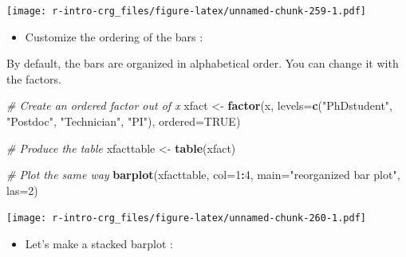 \documentclass[]{book}
\newenvironment{Shaded}{\begin{snugshade}}{\end{snugshade}}
\newcommand{\CommentTok}[1]{\textcolor[rgb]{0.56,0.35,0.01}{\textit{#1}}}
\newcommand{\DataTypeTok}[1]{\textcolor[rgb]{0.13,0.29,0.53}{#1}}
\newcommand{\DecValTok}[1]{\textcolor[rgb]{0.00,0.00,0.81}{#1}}
\newcommand{\KeywordTok}[1]{\textcolor[rgb]{0.13,0.29,0.53}{\textbf{#1}}}
\newcommand{\NormalTok}[1]{#1}
\newcommand{\OperatorTok}[1]{\textcolor[rgb]{0.81,0.36,0.00}{\textbf{#1}}}
\newcommand{\OtherTok}[1]{\textcolor[rgb]{0.56,0.35,0.01}{#1}}
\newcommand{\StringTok}[1]{\textcolor[rgb]{0.31,0.60,0.02}{#1}}
\providecommand{\tightlist}{%
  \setlength{\itemsep}{0pt}\setlength{\parskip}{0pt}}
\begin{document}
\texttt{[image: r-intro-crg\_files/figure-latex/unnamed-chunk-259-1.pdf]}

\begin{itemize}
\tightlist
\item
  Customize the ordering of the bars :
\end{itemize}

By default, the bars are organized in alphabetical order. You can change it with the factors.

\begin{Shaded}
\begin{Highlighting}[]
\CommentTok{# Create an ordered factor out of x}
\NormalTok{xfact <-}\StringTok{ }\KeywordTok{factor}\NormalTok{(x, }
    \DataTypeTok{levels=}\KeywordTok{c}\NormalTok{(}\StringTok{"PhDstudent"}\NormalTok{, }\StringTok{"Postdoc"}\NormalTok{, }\StringTok{"Technician"}\NormalTok{, }\StringTok{"PI"}\NormalTok{), }
    \DataTypeTok{ordered=}\OtherTok{TRUE}\NormalTok{)}

\CommentTok{# Produce the table}
\NormalTok{xfacttable <-}\StringTok{ }\KeywordTok{table}\NormalTok{(xfact)}

\CommentTok{# Plot the same way}
\KeywordTok{barplot}\NormalTok{(xfacttable,}
    \DataTypeTok{col=}\DecValTok{1}\OperatorTok{:}\DecValTok{4}\NormalTok{,}
        \DataTypeTok{main=}\StringTok{"reorganized bar plot"}\NormalTok{,}
        \DataTypeTok{las=}\DecValTok{2}\NormalTok{)}
\end{Highlighting}
\end{Shaded}

\texttt{[image: r-intro-crg\_files/figure-latex/unnamed-chunk-260-1.pdf]}

\begin{itemize}
\tightlist
\item
  Let's make a stacked barplot :
\end{itemize}
\end{document}
